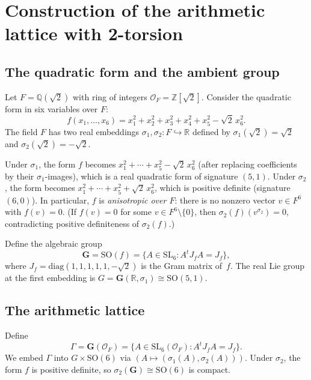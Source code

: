 \documentclass[12pt]{article}
\theoremstyle{definition}
\theoremstyle{remark}
\begin{document}
\section{Construction of the arithmetic lattice with 2-torsion}
\label{sec:lattice}

\subsection{The quadratic form and the ambient group}

Let $F = \mathbb{Q}(\sqrt{2})$ with ring of integers $\mathcal{O}_F = \mathbb{Z}[\sqrt{2}]$.
Consider the quadratic form in six variables over $F$:
\begin{equation}
  \label{eq:form}
  f(x_1,\ldots,x_6) = x_1^2 + x_2^2 + x_3^2 + x_4^2 + x_5^2 - \sqrt{2}\,x_6^2.
\end{equation}
The field $F$ has two real embeddings $\sigma_1, \sigma_2: F \hookrightarrow \mathbb{R}$
defined by $\sigma_1(\sqrt{2}) = \sqrt{2}$ and $\sigma_2(\sqrt{2}) = -\sqrt{2}$.

Under $\sigma_1$, the form $f$ becomes $x_1^2 + \cdots + x_5^2 - \sqrt{2}\,x_6^2$
(after replacing coefficients by their $\sigma_1$-images), which is a real quadratic
form of signature $(5,1)$. Under $\sigma_2$, the form becomes
$x_1^2 + \cdots + x_5^2 + \sqrt{2}\,x_6^2$, which is positive definite (signature
$(6,0)$). In particular, $f$ is \emph{anisotropic over $F$}: there is no nonzero
vector $v \in F^6$ with $f(v) = 0$. (If $f(v) = 0$ for some $v \in F^6 \setminus\{0\}$,
then $\sigma_2(f)(v^{\sigma_2}) = 0$, contradicting positive definiteness of $\sigma_2(f)$.)

Define the algebraic group
\[
  \mathbf{G} = \mathrm{SO}(f) = \{A \in \mathrm{SL}_6 : A^t J_f A = J_f\},
\]
where $J_f = \mathrm{diag}(1,1,1,1,1,-\sqrt{2})$ is the Gram matrix of~$f$.
The real Lie group at the first embedding is
$G = \mathbf{G}(\mathbb{R},\sigma_1) \cong \mathrm{SO}(5,1)$.

\subsection{The arithmetic lattice}
\label{sub:lattice}

Define
\[
  \Gamma = \mathbf{G}(\mathcal{O}_F)
  = \{ A \in \mathrm{SL}_6(\mathcal{O}_F) : A^t J_f A = J_f \}.
\]
We embed $\Gamma$ into $G \times \mathrm{SO}(6)$ via $(A \mapsto (\sigma_1(A), \sigma_2(A)))$.
Under $\sigma_2$, the form $f$ is positive definite, so $\sigma_2(\mathbf{G}) \cong \mathrm{SO}(6)$
is compact.
\end{document}
